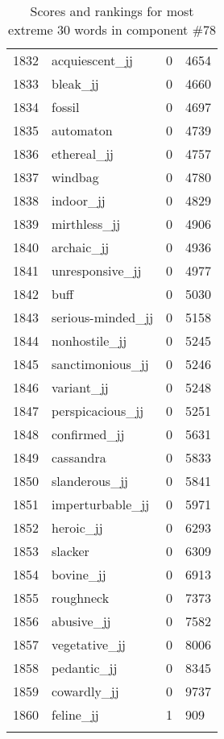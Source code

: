 \begin{longtable}[!htbp]{| rlr@{.}l |}
    1832 & acquiescent\_jj & 0 & 4654 \\
    1833 & bleak\_jj & 0 & 4660 \\
    1834 & fossil & 0 & 4697 \\
    1835 & automaton & 0 & 4739 \\
    1836 & ethereal\_jj & 0 & 4757 \\
    1837 & windbag & 0 & 4780 \\
    1838 & indoor\_jj & 0 & 4829 \\
    1839 & mirthless\_jj & 0 & 4906 \\
    1840 & archaic\_jj & 0 & 4936 \\
    1841 & unresponsive\_jj & 0 & 4977 \\
    1842 & buff & 0 & 5030 \\
    1843 & serious-minded\_jj & 0 & 5158 \\
    1844 & nonhostile\_jj & 0 & 5245 \\
    1845 & sanctimonious\_jj & 0 & 5246 \\
    1846 & variant\_jj & 0 & 5248 \\
    1847 & perspicacious\_jj & 0 & 5251 \\
    1848 & confirmed\_jj & 0 & 5631 \\
    1849 & cassandra & 0 & 5833 \\
    1850 & slanderous\_jj & 0 & 5841 \\
    1851 & imperturbable\_jj & 0 & 5971 \\
    1852 & heroic\_jj & 0 & 6293 \\
    1853 & slacker & 0 & 6309 \\
    1854 & bovine\_jj & 0 & 6913 \\
    1855 & roughneck & 0 & 7373 \\
    1856 & abusive\_jj & 0 & 7582 \\
    1857 & vegetative\_jj & 0 & 8006 \\
    1858 & pedantic\_jj & 0 & 8345 \\
    1859 & cowardly\_jj & 0 & 9737 \\
    1860 & feline\_jj & 1 & 909 \\
    \hline
    \caption{Scores and rankings for most extreme 30 words in component \#78} \\
\end{longtable}
